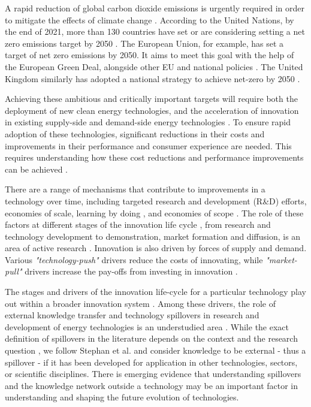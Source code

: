 \documentclass[parskip=full]{article}
\begin{document}
A rapid reduction of global carbon dioxide emissions is urgently required in order to mitigate the effects of climate change \cite{Forster2019}. According to the United Nations, by the end of 2021, more than 130 countries have set or are considering setting a net zero emissions target by 2050 \cite{un2021climate}. The European Union, for example, has set a target of net zero emissions by 2050. It aims to meet this goal with the help of the European Green Deal, alongside other EU and national policies \cite{eu2020green}. The United Kingdom similarly has adopted a national strategy to achieve net-zero by 2050 \cite{noauthor_ieairena_2023}.

Achieving these ambitious and critically important targets will require both the deployment of new clean energy technologies, and the acceleration of innovation in existing supply-side \cite{sinn2012green} and demand-side energy technologies \cite{rgeVorsatz2009}. To ensure rapid adoption of these technologies, significant reductions in their costs and improvements in their performance and consumer experience are needed. This requires understanding how these cost reductions and performance improvements can be achieved \cite{Stephan2021,Ziegler2021}.

There are a range of mechanisms that contribute to improvements in a technology over time, including targeted research and development (R\&D) efforts, economies of scale, learning by doing \cite{Arrow1971}, and economies of scope \cite{national2016power,iea2020perspectives}. The role of these factors at different stages of the innovation life cycle \cite{grubler2012policies}, from research and technology development to demonstration, market formation and diffusion, is an area of active research \cite{Mowery1979} \cite{kavlak2018evaluating} \cite{Ziegler2021}. Innovation is also driven by forces of supply and demand. Various \textit{"technology-push"} drivers reduce the costs of innovating, while \textit{"market-pull"} drivers increase the pay-offs from investing in innovation \cite{anadon2009policy}.

The stages and drivers of the innovation life-cycle for a particular technology play out within a broader innovation system \cite{grubler2012policies,Anadon2016}. Among these drivers, the role of external  knowledge transfer and technology spillovers in research and development of energy technologies is an understudied area  \cite{Stephan2021}. While the exact definition of spillovers in the literature depends on the context and the research question \cite{Nemet2012}, we follow Stephan et al. \cite{Stephan2021} and consider knowledge to be external - thus a spillover -  if it has been developed for application in other technologies, sectors, or scientific disciplines. There is emerging evidence that understanding spillovers and the knowledge network outside a technology may be an important factor in understanding \cite{Pichler2020} and shaping \cite{Clark2016,Stephan2021,Sun2021,kolesnikov2022technology} the future evolution of technologies.
\end{document}
